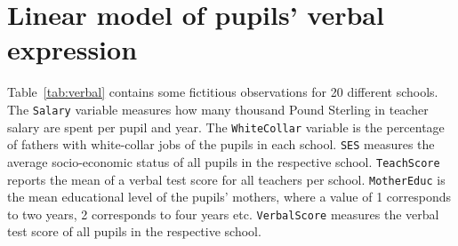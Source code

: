 \documentclass[a4paper,11pt]{article}
\begin{document}
\section{Linear model of pupils' verbal expression}
Table~\ref{tab:verbal} contains some fictitious observations for 20 different schools. The \texttt{Salary} variable measures how many thousand Pound Sterling in teacher salary are spent per pupil and year. The \texttt{WhiteCollar} variable is the percentage of fathers with white-collar jobs of the pupils in each school. \texttt{SES} measures the average socio-economic status of all pupils in the respective school. \texttt{TeachScore} reports the mean of a verbal test score for all teachers per school. \texttt{MotherEduc} is the mean educational level of the pupils' mothers, where a value of 1 corresponds to two years, 2 corresponds to four years etc. \texttt{VerbalScore} measures the verbal test score of all pupils in the respective school.
\end{document}
